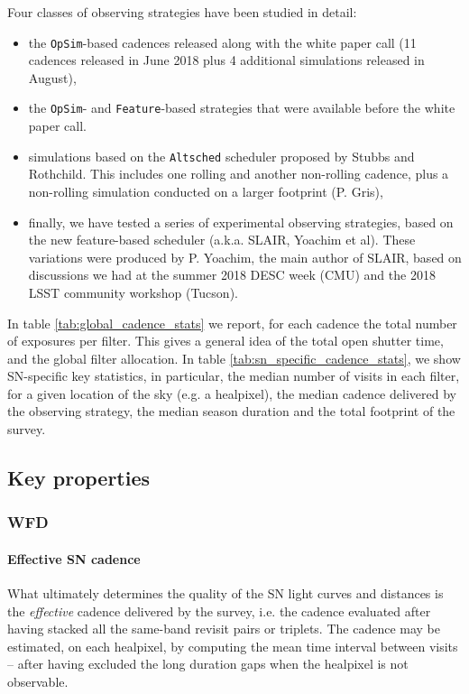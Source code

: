 \documentclass [11pt,a4paper]{article}
\begin{document}
Four classes of observing strategies have been studied in detail:
\begin{itemize}

\item the {\tt OpSim}-based cadences released along with the white
  paper call (11 cadences released in June 2018 plus 4 additional
  simulations released in August), 
  
\item the {\tt OpSim}- and {\tt Feature}-based strategies that were
  available before the white paper call. 

\item simulations based on the {\tt Altsched} scheduler proposed by
  Stubbs and Rothchild.  This includes one rolling and another
  non-rolling cadence, plus a non-rolling simulation conducted on a
  larger footprint (P. Gris),

\item finally, we have tested a series of experimental observing
  strategies, based on the new feature-based scheduler (a.k.a.  SLAIR,
  Yoachim et al). These variations were produced by P. Yoachim, the
  main author of SLAIR, based on discussions we had at the summer 2018
  DESC week (CMU) and the 2018 LSST community workshop (Tucson).
\end{itemize}

In table \ref{tab:global_cadence_stats} we report, for each cadence
the total number of exposures per filter. This gives a general idea of
the total open shutter time, and the global filter allocation.  In
table \ref{tab:sn_specific_cadence_stats}, we show SN-specific key
statistics, in particular, the median number of visits in each filter,
for a given location of the sky (e.g. a healpixel), the median cadence
delivered by the observing strategy, the median season duration and
the total footprint of the survey.


\subsection{Key properties}

\subsubsection {WFD}

\paragraph{Effective SN cadence} What ultimately determines the quality of the SN light curves
and distances is the {\em effective} cadence delivered by the survey,
i.e.  the cadence evaluated after having stacked all the same-band
revisit pairs or triplets. The cadence may be estimated, on each
healpixel, by computing the mean time interval between visits -- after
having excluded the long duration gaps when the healpixel is not
observable.
\end{document}
